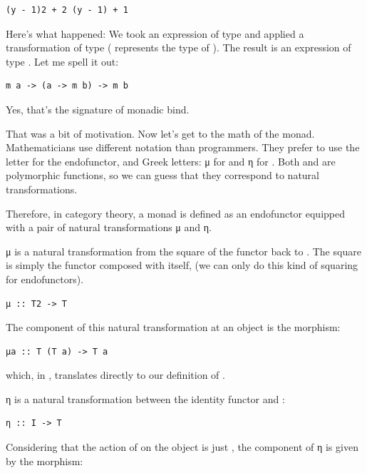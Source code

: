 \begin{verbatim}
(y - 1)2 + 2 (y - 1) + 1
\end{verbatim}

Here's what happened: We took an expression of type  and
applied a transformation of type 
( represents the type of ). The result is an
expression of type . Let me spell it out:

\begin{verbatim}
m a -> (a -> m b) -> m b
\end{verbatim}

Yes, that's the signature of monadic bind.

That was a bit of motivation. Now let's get to the math of the monad.
Mathematicians use different notation than programmers. They prefer to
use the letter  for the endofunctor, and Greek letters: μ for
 and η for . Both  and
 are polymorphic functions, so we can guess that they
correspond to natural transformations.

Therefore, in category theory, a monad is defined as an endofunctor
 equipped with a pair of natural transformations μ and η.

μ is a natural transformation from the square of the functor 
back to . The square is simply the functor composed with
itself,  (we can only do this kind of squaring for
endofunctors).

\begin{verbatim}
μ :: T2 -> T
\end{verbatim}

The component of this natural transformation at an object  is
the morphism:

\begin{verbatim}
μa :: T (T a) -> T a
\end{verbatim}

which, in , translates directly to our definition of
.

η is a natural transformation between the identity functor 
and :

\begin{verbatim}
η :: I -> T
\end{verbatim}

Considering that the action of  on the object  is
just , the component of η is given by the morphism:

